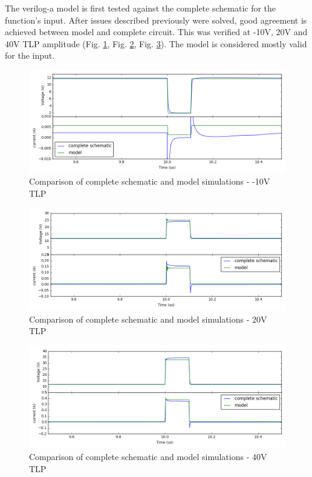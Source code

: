 The verilog-a model is first tested against the complete schematic for the function's input.
After issues described previously were solved, good agreement is achieved between model and complete circuit.
This was verified at -10V, 20V and 40V TLP amplitude (Fig. \ref{fig:compare-model-simu-m10}, Fig. \ref{fig:compare-model-simu-20}, Fig. \ref{fig:compare-model-simu-40}).
The model is considered mostly valid for the input.

\begin{figure}[!h]
  \centering
  \includegraphics[width=\textwidth]{src/4/figures/comparison_model_total_m10V.png}
  \caption{Comparison of complete schematic and model simulations - -10V TLP}
  \label{fig:compare-model-simu-m10}
\end{figure}

\begin{figure}[!h]
  \centering
  \includegraphics[width=\textwidth]{src/4/figures/comparison_model_total_20V.png}
  \caption{Comparison of complete schematic and model simulations - 20V TLP}
  \label{fig:compare-model-simu-20}
\end{figure}

\begin{figure}[!h]
  \centering
  \includegraphics[width=\textwidth]{src/4/figures/comparison_model_total_40V.png}
  \caption{Comparison of complete schematic and model simulations - 40V TLP}
  \label{fig:compare-model-simu-40}
\end{figure}

